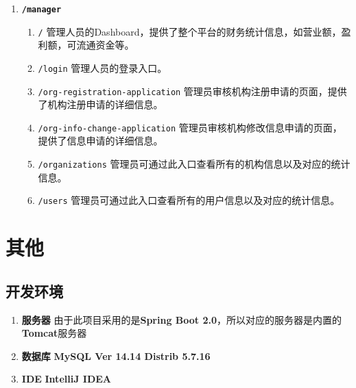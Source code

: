 \documentclass[11pt]{article}
\begin{document}
\begin{enumerate}
  \item \textbf{\texttt{/manager}}
    \begin{enumerate}
      \item \texttt{/} 管理人员的Dashboard，提供了整个平台的财务统计信息，如营业额，盈利额，可流通资金等。
      \item \texttt{/login} 管理人员的登录入口。
      \item \texttt{/org-registration-application} 管理员审核机构注册申请的页面，提供了机构注册申请的详细信息。
      \item \texttt{/org-info-change-application} 管理员审核机构修改信息申请的页面，提供了信息申请的详细信息。
      \item \texttt{/organizations} 管理员可通过此入口查看所有的机构信息以及对应的统计信息。
      \item \texttt{/users} 管理员可通过此入口查看所有的用户信息以及对应的统计信息。
    \end{enumerate}
\end{enumerate}

\section{其他}


\subsection{开发环境}
\begin{enumerate}
  \item \textbf{服务器} 由于此项目采用的是\textbf{Spring Boot 2.0}，所以对应的服务器是内置的\textbf{Tomcat}服务器
  \item \textbf{数据库} \textbf{MySQL Ver 14.14 Distrib 5.7.16}
  \item \textbf{IDE} \textbf{IntelliJ IDEA}
\end{enumerate}
\end{document}
